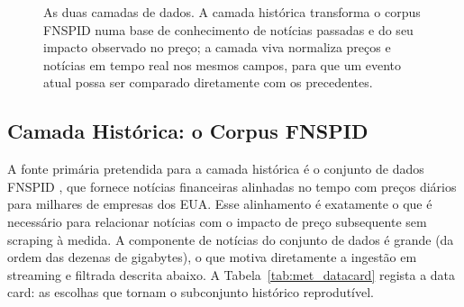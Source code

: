 \begin{figure}[ht]
\centering
{}
\caption[As duas camadas de dados]{As duas camadas de dados. A camada histórica transforma o corpus FNSPID
numa base de conhecimento de notícias passadas e do seu impacto observado no preço; a camada viva normaliza
preços e notícias em tempo real nos mesmos campos, para que um evento atual possa ser comparado diretamente
com os precedentes.}
\label{fig:data_layers}
\end{figure}

\subsection{Camada Histórica: o Corpus FNSPID}
\label{sec:met_data_fnspid}

A fonte primária pretendida para a camada histórica é o conjunto de dados FNSPID \autocite{dong2024fnspid},
que fornece notícias financeiras alinhadas no tempo com preços diários para milhares de empresas dos EUA.
Esse alinhamento é exatamente o que é necessário para relacionar notícias com o impacto de preço
subsequente sem scraping à medida. A componente de notícias do conjunto de dados é grande (da ordem das
dezenas de gigabytes), o que motiva diretamente a ingestão em streaming e filtrada descrita abaixo. A
Tabela~\ref{tab:met_datacard} regista a data card: as escolhas que tornam o subconjunto histórico
reprodutível.


